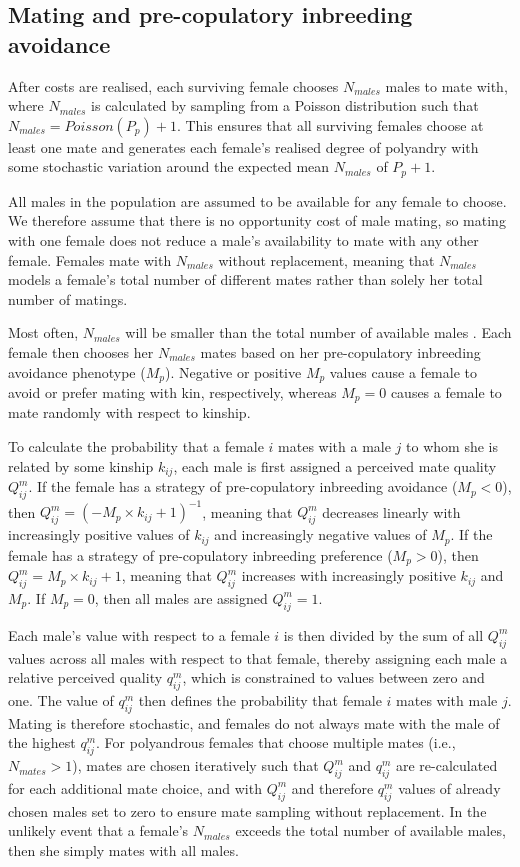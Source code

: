 \documentclass[10pt,letterpaper]{article}
\begin{document}
\subsection*{Mating and pre-copulatory inbreeding avoidance}

After costs are realised, each surviving female chooses $N_{males}$ males to mate with, where $N_{males}$ is calculated by sampling from a Poisson distribution such that $N_{males} = Poisson(P_{p}) + 1$. This ensures that all surviving females choose at least one mate and generates each female's realised degree of polyandry with some stochastic variation around the expected mean $N_{males}$ of $P_{p}+1$. 

All males in the population are assumed to be available for any female to choose. We therefore assume that there is no opportunity cost of male mating, so mating with one female does not reduce a male's availability to mate with any other female. Females mate with $N_{males}$ without replacement, meaning that $N_{males}$ models a female's total number of different mates rather than solely her total number of matings.

Most often, $N_{males}$ will be smaller than the total number of available males \cite[][]{Duthie}. Each female then chooses her $N_{males}$ mates based on her pre-copulatory inbreeding avoidance phenotype ($M_{p}$). Negative or positive $M_{p}$ values cause a female to avoid or prefer mating with kin, respectively, whereas $M_{p}=0$ causes a female to mate randomly with respect to kinship.

To calculate the probability that a female $i$ mates with a male $j$ to whom she is related by some kinship $k_{ij}$, each male is first assigned a perceived mate quality $Q^{m}_{ij}$. If the female has a strategy of pre-copulatory inbreeding avoidance ($M_{p}<0$), then $Q^{m}_{ij} = (-M_{p} \times k_{ij} + 1)^{-1}$, meaning that $Q^{m}_{ij}$ decreases linearly with increasingly positive values of $k_{ij}$ and increasingly negative values of $M_{p}$. If the female has a strategy of pre-copulatory inbreeding preference ($M_{p}>0$), then $Q^{m}_{ij} = M_{p} \times k_{ij} + 1$, meaning that $Q^{m}_{ij}$ increases with increasingly positive $k_{ij}$ and $M_{p}$. If $M_{p}=0$, then all males are assigned $Q^{m}_{ij}=1$.

Each male's value with respect to a female $i$ is then divided by the sum of all $Q^{m}_{ij}$ values across all males with respect to that female, thereby assigning each male a relative perceived quality $q^{m}_{ij}$, which is constrained to values between zero and one. The value of $q^{m}_{ij}$ then defines the probability that female $i$ mates with male $j$. Mating is therefore stochastic, and females do not always mate with the male of the highest $q^{m}_{ij}$. For polyandrous females that choose multiple mates (i.e., $N_{mates}>1$), mates are chosen iteratively such that $Q^{m}_{ij}$ and $q^{m}_{ij}$ are re-calculated for each additional mate choice, and with $Q^{m}_{ij}$ and therefore $q^{m}_{ij}$ values of already chosen males set to zero to ensure mate sampling without replacement. In the unlikely event that a female's $N_{males}$ exceeds the total number of available males, then she simply mates with all males.
\end{document}
